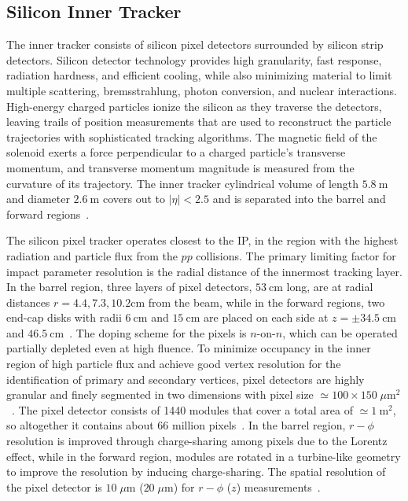 \subsection{Silicon Inner Tracker}
The inner tracker consists of silicon pixel detectors surrounded by silicon strip detectors.
Silicon detector technology provides high granularity, fast response, radiation hardness, and efficient cooling, while also minimizing material to limit multiple scattering, bremsstrahlung, photon conversion, and nuclear interactions.
High-energy charged particles ionize the silicon as they traverse the detectors, leaving trails of position measurements that are used to reconstruct the particle trajectories with sophisticated tracking algorithms.
The magnetic field of the solenoid exerts a force perpendicular to a charged particle's transverse momentum, and transverse momentum magnitude is measured from the curvature of its trajectory.
The inner tracker cylindrical volume of length $\SI{5.8}{\m}$ and diameter $\SI{2.6}{\m}$ covers out to $\vert \eta \vert < 2.5$ and is separated into the barrel and forward regions~\cite{Chatrchyan:1129810}.

The silicon pixel tracker operates closest to the IP, in the region with the highest radiation and particle flux from the $pp$ collisions.
The primary limiting factor for impact parameter resolution is the radial distance of the innermost tracking layer.
In the barrel region, three layers of pixel detectors, $\SI{53}{\cm}$ long, are at radial distances $r = 4.4, 7.3, 10.2 \si{\cm}$ from the beam, while in the forward regions, two end-cap disks with radii $\SI{6}{\cm}$ and $\SI{15}{\cm}$ are placed on each side at $z = \pm \SI{34.5}{\cm}$ and $\SI{46.5}{\cm}$~\cite{Chatrchyan:1129810}.
The doping scheme for the pixels is $n$-on-$n$, which can be operated partially depleted even at high fluence.
To minimize occupancy in the inner region of high particle flux and achieve good vertex resolution for the identification of primary and secondary vertices, pixel detectors are highly granular and finely segmented in two dimensions with pixel size $\simeq 100 \times 150 \; \mu \si{\m \squared}$~\cite{Chatrchyan:1129810}.
The pixel detector consists of 1440 modules that cover a total area of $\simeq \SI{1}{\m \squared}$, so altogether it contains about 66 million pixels~\cite{Bayatian:922757}.
In the barrel region, $r-\phi$ resolution is improved through charge-sharing among pixels due to the Lorentz effect, while in the forward region, modules are rotated in a turbine-like geometry to improve the resolution by inducing charge-sharing.
The spatial resolution of the pixel detector is $10 \; \mu \si{\m}$ ($20 \; \mu \si{\m}$) for $r-\phi$ ($z$) measurements~\cite{Chatrchyan:1129810}.

